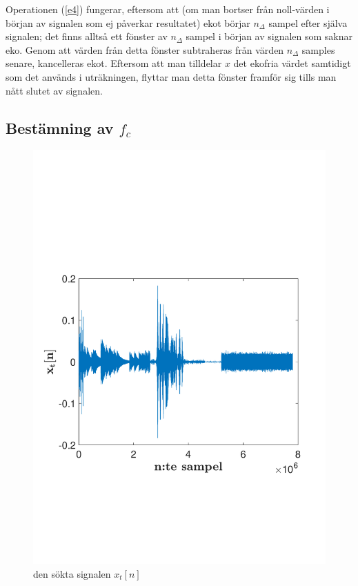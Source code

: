 \documentclass[10pt,twocolumn,a4paper]{article}
\begin{document}
Operationen (\ref{e4}) fungerar, eftersom att (om man bortser från noll-värden i början av signalen som ej påverkar resultatet) ekot börjar $n_\Delta$
sampel efter själva signalen; det finns alltså ett fönster av $n_\Delta$ sampel i början av signalen som saknar eko. Genom att
värden från detta fönster subtraheras från värden $n_\Delta$ samples senare, kancelleras ekot. Eftersom att man tilldelar $x$ det ekofria
värdet samtidigt som det används i uträkningen, flyttar man detta fönster framför sig tills man nått slutet av signalen.

\subsection{Bestämning av $f_c$}

\begin{figure}[h]
    \includegraphics[trim = 0 50mm 0 80mm, clip, width=\linewidth]{fig2.pdf}
    \caption{
        den sökta signalen $x_t[n]$ 
        \label{fig:xt}
    }
\end{figure}
\end{document}
